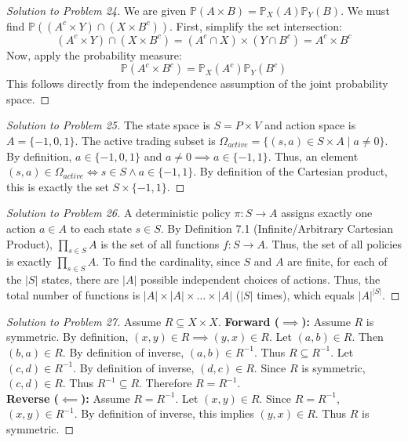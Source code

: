 \documentclass[11pt]{article}
\begin{document}
\begin{proof}[Solution to Problem 24]
We are given $\mathbb{P}(A \times B) = \mathbb{P}_X(A)\mathbb{P}_Y(B)$. We must find $\mathbb{P}((A^c \times Y) \cap (X \times B^c))$.
First, simplify the set intersection:
\[ (A^c \times Y) \cap (X \times B^c) = (A^c \cap X) \times (Y \cap B^c) = A^c \times B^c \]
Now, apply the probability measure:
\[ \mathbb{P}(A^c \times B^c) = \mathbb{P}_X(A^c)\mathbb{P}_Y(B^c) \]
This follows directly from the independence assumption of the joint probability space.
\end{proof}

\begin{proof}[Solution to Problem 25]
The state space is $S = P \times V$ and action space is $A = \{-1, 0, 1\}$.
The active trading subset is $\Omega_{active} = \{(s, a) \in S \times A \mid a \neq 0\}$.
By definition, $a \in \{-1, 0, 1\}$ and $a \neq 0 \implies a \in \{-1, 1\}$.
Thus, an element $(s,a) \in \Omega_{active} \iff s \in S \land a \in \{-1, 1\}$.
By definition of the Cartesian product, this is exactly the set $S \times \{-1, 1\}$.
\end{proof}

\begin{proof}[Solution to Problem 26]
A deterministic policy $\pi: S \to A$ assigns exactly one action $a \in A$ to each state $s \in S$.
By Definition 7.1 (Infinite/Arbitrary Cartesian Product), $\prod_{s \in S} A$ is the set of all functions $f: S \to A$. Thus, the set of all policies is exactly $\prod_{s \in S} A$.
To find the cardinality, since $S$ and $A$ are finite, for each of the $|S|$ states, there are $|A|$ possible independent choices of actions. 
Thus, the total number of functions is $|A| \times |A| \times \dots \times |A|$ ($|S|$ times), which equals $|A|^{|S|}$.
\end{proof}

\begin{proof}[Solution to Problem 27]
Assume $R \subseteq X \times X$. 
\textbf{Forward ($\implies$):} Assume $R$ is symmetric. By definition, $(x,y) \in R \implies (y,x) \in R$. 
Let $(a,b) \in R$. Then $(b,a) \in R$. By definition of inverse, $(a,b) \in R^{-1}$. Thus $R \subseteq R^{-1}$.
Let $(c,d) \in R^{-1}$. By definition of inverse, $(d,c) \in R$. Since $R$ is symmetric, $(c,d) \in R$. Thus $R^{-1} \subseteq R$. Therefore $R = R^{-1}$. \\
\textbf{Reverse ($\impliedby$):} Assume $R = R^{-1}$. Let $(x,y) \in R$. Since $R = R^{-1}$, $(x,y) \in R^{-1}$. By definition of inverse, this implies $(y,x) \in R$. Thus $R$ is symmetric.
\end{proof}
\end{document}
